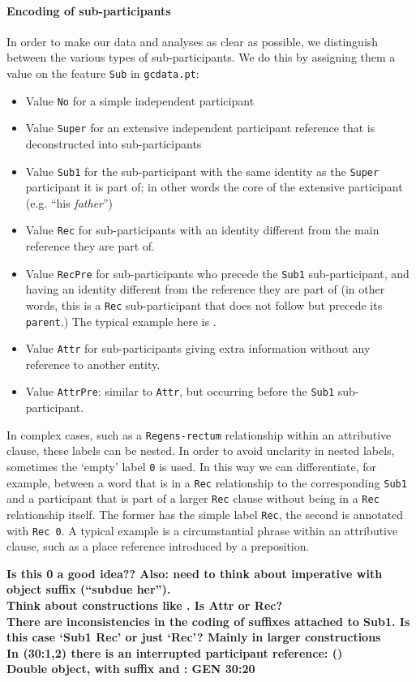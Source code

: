 \documentclass{report}
\newcommand{\mi}[1]{\lstinline{#1}}
\newcommand{\hebr}[1]{\hbox{\cjRL{#1}}}
\begin{document}
\paragraph{Encoding of sub-participants}
In order to make our data and analyses as clear as possible, we distinguish between the various types of sub-participants. We do this by assigning them a value on the feature \mi{Sub} in \mi{gcdata.pt}:
\begin{itemize}
\item Value \mi{No} for a simple independent participant
\item Value \mi{Super} for an extensive independent participant reference that is deconstructed into sub-participants
\item Value \mi{Sub1} for the sub-participant with the same identity as the \mi{Super} participant it is part of; in other words the core of the extensive participant (e.g. ``his \emph{father}'')
\item Value \mi{Rec} for sub-participants with an identity different from the main reference they are part of.
\item Value \mi{RecPre} for sub-participants who precede the \mi{Sub1} sub-participant, and having an identity different from the reference they are part of (in other words, this is a \mi{Rec} sub-participant that does not follow but precede its \mi{parent}.) The typical example here is \hebr{KL}.
\item Value \mi{Attr} for sub-participants giving extra information without any reference to another entity. 
\item Value \mi{AttrPre}: similar to \mi{Attr}, but occurring before the \mi{Sub1} sub-participant.
\end{itemize}

In complex cases, such as a \mi{Regens-rectum} relationship within an attributive clause, these labels can be nested.
In order to avoid unclarity in nested labels, sometimes the `empty' label \mi{0} is used. In this way we can differentiate, for example, between a word that is in a \mi{Rec} relationship to the corresponding \mi{Sub1} and a participant that is part of a larger \mi{Rec} clause without being in a \mi{Rec} relationship itself. The former has the simple label \mi{Rec}, the second is annotated with \mi{Rec 0}. A typical example is a circumstantial phrase within an attributive clause, such as a place reference introduced by a preposition.

\textbf{Is this 0 a good idea?? Also: need to think about imperative with object suffix (``subdue her'').} \\
\textbf{Think about constructions like \hebr{>RY KN<N}. Is \hebr{KN<N} Attr or Rec?} \\
\textbf{There are inconsistencies in the coding of suffixes attached to Sub1. Is this case `Sub1 Rec' or just `Rec'? Mainly in larger constructions} \\
\textbf{In (30:1,2) there is an interrupted participant reference: \hebr{TXT >LHJM} (\hebr{>NKJ}) \hebr{>CR MN< MMK PRJ BVN}}\\
\textbf{Double object, with suffix and \hebr{>T}: GEN 30:20}
\end{document}

